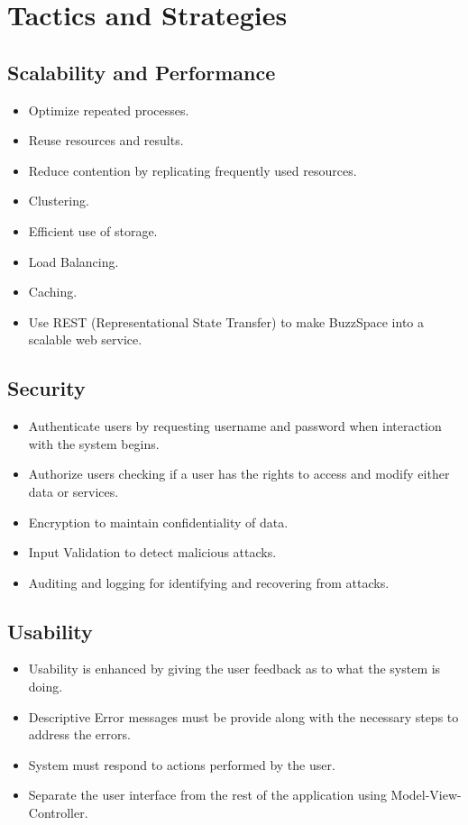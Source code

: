 \section{Tactics and Strategies}
\subsection{Scalability and Performance}
	\begin{itemize}
		\item Optimize repeated processes.
		\item Reuse resources and results.
		\item Reduce contention by replicating frequently used resources.
		\item Clustering.
		\item Efficient use of storage.
		\item Load Balancing.
		\item Caching.
		\item Use REST (Representational State Transfer) to make BuzzSpace into a scalable web service.
	\end{itemize}	
\subsection{Security}
	\begin{itemize}
		\item Authenticate users by requesting username and password when interaction with the system begins.
		\item Authorize users checking if a user has the rights to access and modify either data or services.
		\item Encryption to maintain confidentiality of data.
		\item Input Validation to detect malicious attacks.
		\item Auditing and logging for identifying and recovering from attacks.
	\end{itemize}	
\subsection{Usability}
	\begin{itemize}
		\item Usability is enhanced by giving the user feedback as to what the system is doing.
		\item Descriptive Error messages must be provide along with the necessary steps to address the errors.
		\item System must respond to actions performed by the user.
		\item Separate the user interface from the rest of the application using Model-View-Controller.
	\end{itemize}
